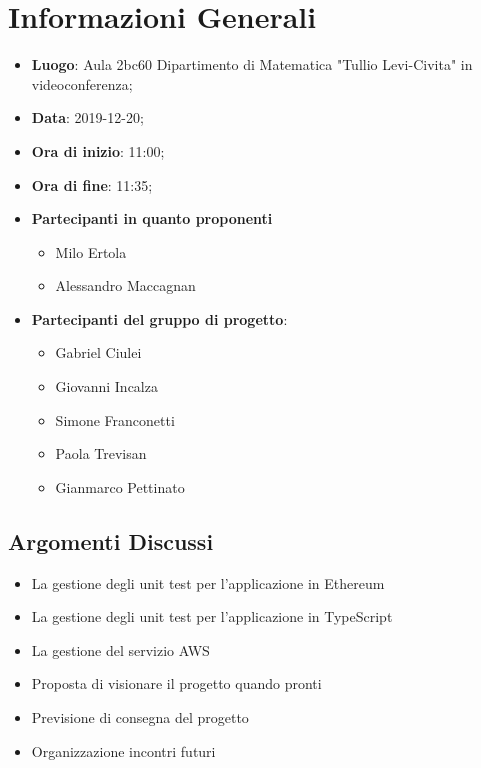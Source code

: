 \section{Informazioni Generali}
	\begin{itemize}
		\item \textbf {Luogo}: Aula 2bc60 Dipartimento di Matematica "Tullio Levi-Civita" in videoconferenza;
		\item \textbf {Data}: 2019-12-20;
		\item \textbf {Ora di inizio}: 11:00;
		\item \textbf {Ora di fine}: 11:35;
		\item \textbf {Partecipanti in quanto proponenti}
		  \begin{itemize}
		    \item Milo Ertola
		    \item Alessandro Maccagnan
		  \end{itemize}
		\item \textbf {Partecipanti del gruppo di progetto}: 
			\begin{itemize}
				\item Gabriel Ciulei
				\item Giovanni Incalza
				\item Simone Franconetti
				\item Paola Trevisan
				\item Gianmarco Pettinato
			\end{itemize}
	\end{itemize}
\subsection{Argomenti Discussi}
	\begin{itemize}
		\item La gestione degli unit test per l'applicazione in Ethereum
		\item La gestione degli unit test per l'applicazione in TypeScript
		\item La gestione del servizio AWS
		\item Proposta di visionare il progetto quando pronti
		\item Previsione di consegna del progetto
		\item Organizzazione incontri futuri
	\end{itemize}
